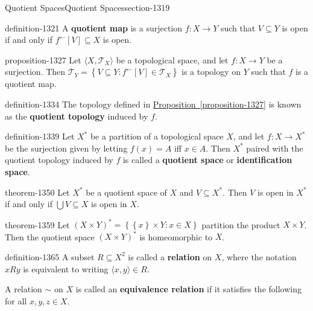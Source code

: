 \documentclass[oneside,10pt,]{article}
\newcommand{\terminology}[1]{\textbf{#1}}
\newcommand{\tuple}[1]{\langle #1 \rangle}
\newcommand{\mc}{\mathcal}
\newcommand{\setBuilder}[2]{\left\{#1:#2\right\}}
\newcommand{\setList}[1]{\left\{#1\right\}}
\begin{document}
\typeout{************************************************}
%
\begin{sectionptx}{Quotient Spaces}{}{Quotient Spaces}{}{}{section-1319}
\begin{definition}{}{definition-1321}%
\hypertarget{p-1322}{}%
A \terminology{quotient map} is a surjection \(f:X\to Y\) such that \(V\subseteq Y\) is open if and only if \(f^\leftarrow[V]\subseteq X\) is open.%
\end{definition}
\begin{proposition}{}{}{proposition-1327}%
\hypertarget{p-1328}{}%
Let \(\tuple{X,\mc T_X}\) be a topological space, and let \(f:X\to Y\) be a surjection. Then \(\mc T_Y=\setBuilder{V\subseteq Y}{f^\leftarrow[V]\in\mc T_X}\) is a topology on \(Y\) such that \(f\) is a quotient map.%
\end{proposition}
\begin{definition}{}{definition-1334}%
\hypertarget{p-1335}{}%
The topology defined in \hyperref[proposition-1327]{Proposition~\ref{proposition-1327}} is known as the \terminology{quotient topology} induced by \(f\).%
\end{definition}
\begin{definition}{}{definition-1339}%
\hypertarget{p-1340}{}%
Let \(X^*\) be a partition of a topological space \(X\), and let \(f:X\to X^*\) be the surjection given by letting \(f(x)=A\) iff \(x\in A\). Then \(X^*\) paired with the quotient topology induced by \(f\) is called a \terminology{quotient space} or \terminology{identification space}.%
\end{definition}
\begin{theorem}{}{}{theorem-1350}%
\hypertarget{p-1351}{}%
Let \(X^*\) be a quotient space of \(X\) and \(V\subseteq X^*\). Then \(V\) is open in \(X^*\) if and only if \(\bigcup V\subseteq X\) is open in \(X\).%
\end{theorem}
\begin{theorem}{}{}{theorem-1359}%
\hypertarget{p-1360}{}%
Let \((X\times Y)^*=\setBuilder{\setList{x}\times Y}{x\in X}\) partition the product \(X\times Y\). Then the quotient space \((X\times Y)^*\) is homeomorphic to \(X\).%
\end{theorem}
\begin{definition}{}{definition-1365}%
\hypertarget{p-1366}{}%
A subset \(R\subseteq X^2\) is called a \terminology{relation} on \(X\), where the notation \(xRy\) is equivalent to writing \(\tuple{x,y}\in R\).%
\par
\hypertarget{p-1372}{}%
A relation \(\sim\) on \(X\) is called an \terminology{equivalence relation} if it satisfies the following for all \(x,y,z\in X\).%

\end{definition}
\end{sectionptx}
\end{document}
